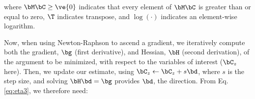 \noindent where $\bM \bC \geq \ve{0}$ indicates that every element of $\bM \bC$ is greater than or equal to zero, $\T$ indicates transpose, and $\log(\cdot)$ indicates an element-wise logarithm.  %
%


%
% 
Now, when using Newton-Raphson to ascend a gradient, we iteratively compute both the gradient, $\bg$ (first derivative), and Hessian, $\bH$ (second derivation), of the argument to be minimized, with respect to the variables of interest ($\bC_z$ here).  Then, we update our estimate, using $\bC_z \leftarrow \bC_z + s \bd$, where $s$ is the step size, and solving $\bH \bd = \bg$ provides $\bd$, the direction.  From Eq. \eqref{eq:eta3}, we therefore need:

% 


